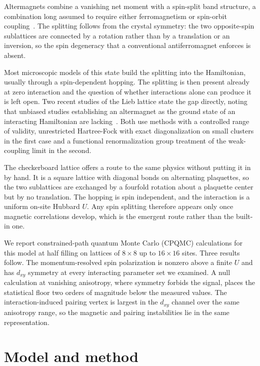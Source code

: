 \documentclass[aps,prb,reprint,superscriptaddress,amsmath,amssymb,floatfix]{revtex4-2}
\begin{document}
Altermagnets combine a vanishing net moment with a spin-split band structure,
a combination long assumed to require either ferromagnetism or spin-orbit
coupling~\cite{Smejkal2022a,Smejkal2022b}. The splitting follows from the
crystal symmetry: the two opposite-spin sublattices are connected by a rotation
rather than by a translation or an inversion, so the spin degeneracy that a
conventional antiferromagnet enforces is absent.

Most microscopic models of this state build the splitting into the Hamiltonian,
usually through a spin-dependent hopping. The splitting is then present already
at zero interaction and the question of whether interactions alone can produce
it is left open. Two recent studies of the Lieb lattice state the gap directly,
noting that unbiased studies establishing an altermagnet as the ground state of
an interacting Hamiltonian are lacking~\cite{Kaushal2025,Duerrnagel2025}. Both
use methods with a controlled range of validity, unrestricted Hartree-Fock with
exact diagonalization on small clusters in the first case and a functional
renormalization group treatment of the weak-coupling limit in the second.

The checkerboard lattice offers a route to the same physics without putting it
in by hand. It is a square lattice with diagonal bonds on alternating
plaquettes, so the two sublattices are exchanged by a fourfold rotation about a
plaquette center but by no translation. The hopping is spin independent, and
the interaction is a uniform on-site Hubbard $U$. Any spin splitting therefore
appears only once magnetic correlations develop, which is the emergent route
rather than the built-in one.

We report constrained-path quantum Monte Carlo (CPQMC) calculations for this
model at half filling on lattices of $8\times8$ up to $16\times16$ sites. Three results follow. The momentum-resolved spin polarization is nonzero
above a finite $U$ and has $d_{xy}$ symmetry at every interacting parameter set
we examined. A null calculation at vanishing anisotropy, where symmetry forbids
the signal, places the statistical floor two orders of magnitude below the
measured values. The interaction-induced pairing vertex is largest in the
$d_{xy}$ channel over the same anisotropy range, so the magnetic and pairing
instabilities lie in the same representation.

\section{Model and method}
\end{document}
